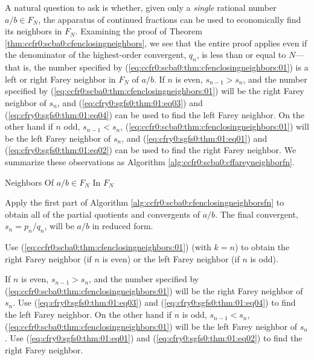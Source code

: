 A natural question to ask is whether, given only a \emph{single}
rational number $a/b \in F_N$, the apparatus of continued fractions
can be used to economically find its neighbors in $F_N$.  Examining
the proof of Theorem \ref{thm:ccfr0:scba0:cfenclosingneighbors},
we see that the entire proof applies even if the denominator of the 
highest-order convergent, $q_n$, is less than or equal to $N$---that is,
the number specified by (\ref{eq:ccfr0:scba0:thm:cfenclosingneighbors:01})
is a left or right Farey neighbor in $F_N$ of $a/b$.  If $n$ is even,
$s_{n-1} > s_n$, and the number specified by 
(\ref{eq:ccfr0:scba0:thm:cfenclosingneighbors:01}) will be the right Farey neighbor
of $s_n$, and 
(\cfryzeroxrefhyphen{}\ref{eq:cfry0:sgfs0:thm:01:eq03}) and 
(\cfryzeroxrefhyphen{}\ref{eq:cfry0:sgfs0:thm:01:eq04}) 
can be used to find the left Farey neighbor.
On the other hand if $n$ odd, $s_{n-1} < s_n$, (\ref{eq:ccfr0:scba0:thm:cfenclosingneighbors:01})
will be the left Farey neighbor of $s_n$, and 
(\cfryzeroxrefhyphen{}\ref{eq:cfry0:sgfs0:thm:01:eq01}) 
and 
(\cfryzeroxrefhyphen{}\ref{eq:cfry0:sgfs0:thm:01:eq02}) 
can be used to find the
right Farey neighbor.  We summarize these observations as Algorithm
\ref{alg:ccfr0:scba0:cffareyneighborfn}.

\begin{vworkalgorithmstatementpar}{Neighbors Of 
                                   \mbox{\boldmath $a/b \in F_N$} 
                                   In \mbox{\boldmath $F_N$}}
\label{alg:ccfr0:scba0:cffareyneighborfn}
\end{vworkalgorithmstatementpar}
\begin{alglvl0}

\item  Apply the first part of Algorithm 
       \ref{alg:ccfr0:scba0:cfenclosingneighborsfn} to obtain
	   all of the partial quotients and convergents of $a/b$.
	   The final convergent, $s_n = p_n/q_n$, will be 
	   $a/b$ in reduced form.

\item  Use (\ref{eq:ccfr0:scba0:thm:cfenclosingneighbors:01})
       (with $k = n$) to obtain the right Farey neighbor
	   (if $n$ is even) or the left Farey neighbor (if $n$
	   is odd).

\item  If $n$ is even, $s_{n-1} > s_n$, and the number specified by 
       (\ref{eq:ccfr0:scba0:thm:cfenclosingneighbors:01}) will be 
	   the right Farey neighbor of $s_n$.  Use 
       (\cfryzeroxrefhyphen{}\ref{eq:cfry0:sgfs0:thm:01:eq03}) and 
       (\cfryzeroxrefhyphen{}\ref{eq:cfry0:sgfs0:thm:01:eq04}) 
       to find the left Farey neighbor.
       On the other hand if $n$ is odd, $s_{n-1} < s_n$, 
	   (\ref{eq:ccfr0:scba0:thm:cfenclosingneighbors:01})
       will be the left Farey neighbor of $s_n$.  Use
       (\cfryzeroxrefhyphen{}\ref{eq:cfry0:sgfs0:thm:01:eq01}) 
       and (\cfryzeroxrefhyphen{}\ref{eq:cfry0:sgfs0:thm:01:eq02}) 
       to find the right Farey neighbor.

\end{alglvl0}

